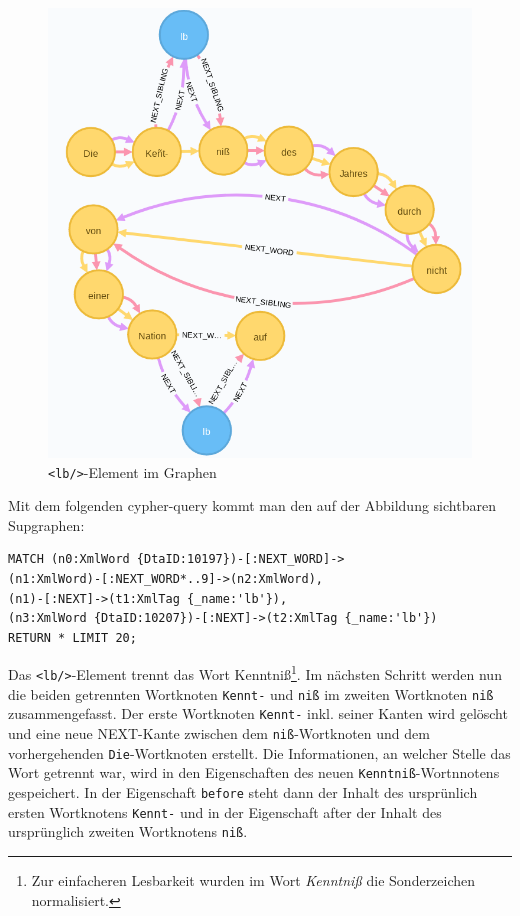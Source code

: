 \documentclass[ngerman,]{scrreprt}
\begin{document}
\begin{figure}
\centering
\includegraphics{Bilder/TEI2Graph/lb mit Worttrennung im Graphen.png}
\caption{\texttt{\textless{}lb/\textgreater{}}-Element im Graphen}
\end{figure}

Mit dem folgenden cypher-query kommt man den auf der Abbildung sichtbaren Supgraphen:

\begin{verbatim}
MATCH (n0:XmlWord {DtaID:10197})-[:NEXT_WORD]->
(n1:XmlWord)-[:NEXT_WORD*..9]->(n2:XmlWord),
(n1)-[:NEXT]->(t1:XmlTag {_name:'lb'}),
(n3:XmlWord {DtaID:10207})-[:NEXT]->(t2:XmlTag {_name:'lb'})
RETURN * LIMIT 20;
\end{verbatim}

Das \texttt{\textless{}lb/\textgreater{}}-Element trennt das Wort Kenntniß\footnote{Zur einfacheren Lesbarkeit wurden im Wort \emph{Kenntniß} die Sonderzeichen normalisiert.}. Im nächsten Schritt werden nun die beiden getrennten Wortknoten \texttt{Kennt-} und \texttt{niß} im zweiten Wortknoten \texttt{niß} zusammengefasst. Der erste Wortknoten \texttt{Kennt-} inkl. seiner Kanten wird gelöscht und eine neue NEXT-Kante zwischen dem \texttt{niß}-Wortknoten und dem vorhergehenden \texttt{Die}-Wortknoten erstellt. Die Informationen, an welcher Stelle das Wort getrennt war, wird in den Eigenschaften des neuen \texttt{Kenntniß}-Wortnnotens gespeichert. In der Eigenschaft \texttt{before} steht dann der Inhalt des ursprünlich ersten Wortknotens \texttt{Kennt-} und in der Eigenschaft after der Inhalt des ursprünglich zweiten Wortknotens \texttt{niß}.
\end{document}
